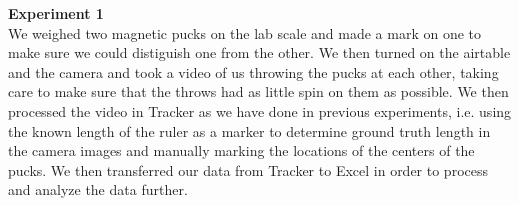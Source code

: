 \documentclass[11pt]{article}
\begin{document}
\begin{figure}[!h]
\begin{floatrow}
   \end{floatrow}
\end{figure}

{\bf Experiment 1}\\

We weighed two magnetic pucks on the lab scale and made a mark on one to make sure we could distiguish one from the other. We then turned on the airtable and the camera and took a video of us throwing the pucks at each other, taking care to make sure that the throws had as little spin on them as possible. We then processed the video in Tracker as we have done in previous experiments, i.e. using the known length of the ruler as a marker to determine ground truth length in the camera images and manually marking the locations of the centers of the pucks. We then transferred our data from Tracker to Excel in order to process and analyze the data further.\\
\end{document}
